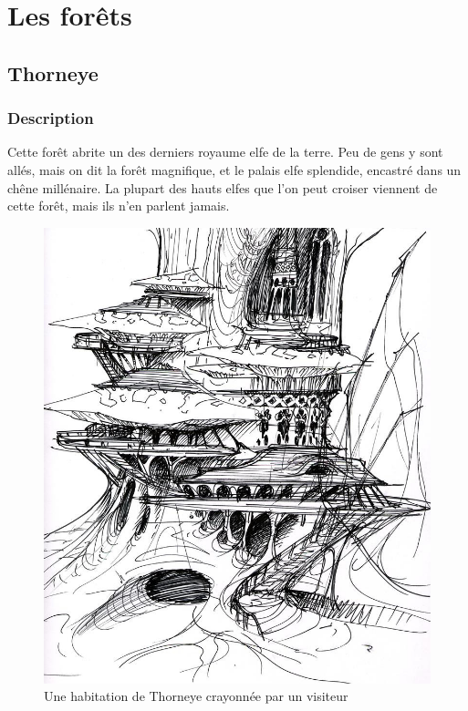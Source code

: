 \section{Les forêts}
\subsection{Thorneye}
\subsubsection{Description}
\hypertarget{thorneye}{}Cette forêt abrite un des derniers royaume elfe de la terre.
Peu de gens y sont allés, mais on dit la forêt magnifique, et le palais elfe splendide, encastré dans un chêne millénaire.
La plupart des hauts elfes que l'on peut croiser viennent de cette forêt, mais ils n'en parlent jamais.
\begin{figure}[h]
\begin{center}
\includegraphics[scale=0.25]{./Ressources/medieval/habitation_thorneye.jpg}
\caption{Une habitation de Thorneye crayonnée par un visiteur}
\end{center}
\end{figure}
